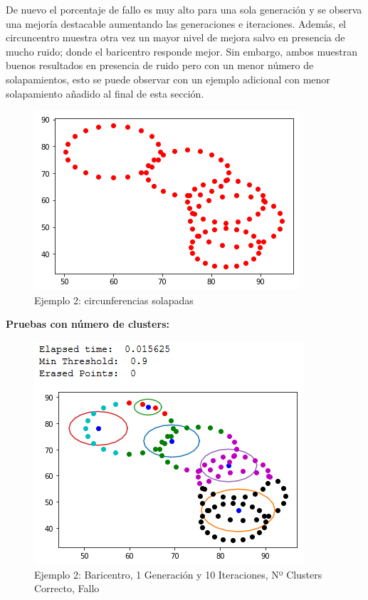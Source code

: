 \documentclass[conference,a4paper]{IEEEtran}
\begin{document}
De nuevo el porcentaje de fallo es muy alto para una sola generación y se observa una mejoría destacable aumentando las generaciones e iteraciones. Además, el circuncentro muestra otra vez un mayor nivel de mejora salvo en presencia de mucho ruido; donde el baricentro responde mejor. Sin embargo, ambos muestran buenos resultados en presencia de ruido pero con un menor número de solapamientos, esto se puede observar con un ejemplo adicional con menor solapamiento añadido al final de esta sección.

\begin{figure}[H]
\centering
\includegraphics[scale=0.65]{Experimentacion/Ejemplo2/Ejemplo2}
\caption{Ejemplo 2: circunferencias solapadas}
\end{figure}


\clearpage
\textbf{Pruebas con número de clusters:}\\

\begin{figure}[H]
\centering
\includegraphics[scale=0.65]{Experimentacion/Ejemplo2/ej2_b_1_10_cc_wrong}
\caption{Ejemplo 2: Baricentro, 1 Generación y 10 Iteraciones,  Nº Clusters Correcto, Fallo\\}
\end{figure}
\end{document}
